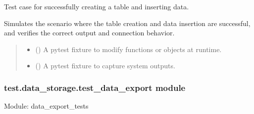 \documentclass[letterpaper,10pt,english]{sphinxmanual}
\begin{document}
\begin{fulllineitems}
\label{\detokenize{test.data_storage:test.data_storage.test_create_table.test_create_table_success}}
\pysigstartsignatures
\pysiglinewithargsret
{}
{\sphinxparamcomma {}}
{}
\pysigstopsignatures
\sphinxAtStartPar
Test case for successfully creating a table and inserting data.

\sphinxAtStartPar
Simulates the scenario where the table creation and data insertion
are successful, and verifies the correct output and connection behavior.
\begin{quote}\begin{description}
\begin{itemize}
\item {} 
\sphinxAtStartPar
{} () \textendash{} A pytest fixture to modify functions or objects at runtime.

\item {} 
\sphinxAtStartPar
{} () \textendash{} A pytest fixture to capture system outputs.

\end{itemize}

\end{description}\end{quote}

\end{fulllineitems}



\subsubsection{test.data\_storage.test\_data\_export module}
\label{\detokenize{test.data_storage:module-test.data_storage.test_data_export}}\label{\detokenize{test.data_storage:test-data-storage-test-data-export-module}}
\sphinxAtStartPar
Module: data\_export\_tests
\end{document}
